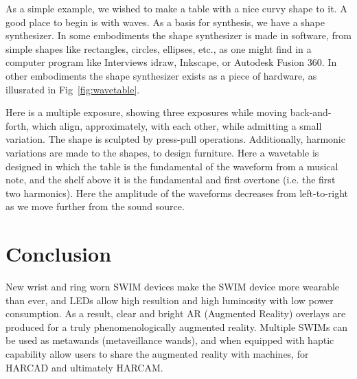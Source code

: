 \documentclass{sigchi-ext}
\begin{document}
As a simple example, we wished to make a table with a nice
curvy shape to it.  A good place to begin is with waves.
As a basis for synthesis, we have a shape synthesizer.
In some embodiments the shape synthesizer is made in software,
from simple shapes like rectangles, circles, ellipses, etc., as one
might find in a computer program like Interviews idraw,
Inkscape, or Autodesk Fusion 360.
In other embodiments the shape synthesizer exists as a piece of hardware,
as illusrated in Fig~\ref{fig:wavetable}.

Here is a multiple exposure, showing three exposures while
moving back-and-forth, which align, approximately, with each other,
while admitting a small variation.
The shape is sculpted by press-pull operations.
Additionally, harmonic variations are made to the shapes, to
design furniture.
Here a wavetable is designed in which the table is the
fundamental of the waveform from a musical note, and the shelf
above it is the fundamental and first overtone
(i.e. the first two harmonics).
Here the amplitude of the waveforms decreases from left-to-right
as we move further from the sound source.

\section{Conclusion}
New wrist and ring worn SWIM devices make the SWIM device more wearable than
ever, and LEDs allow high resultion and high luminosity with low power
consumption. As a result, clear and bright AR (Augmented Reality)
overlays are produced
for a truly phenomenologically augmented reality.
Multiple SWIMs can be used as metawands (metaveillance wands), and when
equipped with haptic capability allow users to share the augmented reality
with machines, for HARCAD and ultimately HARCAM.


\balance{}



\end{document}
